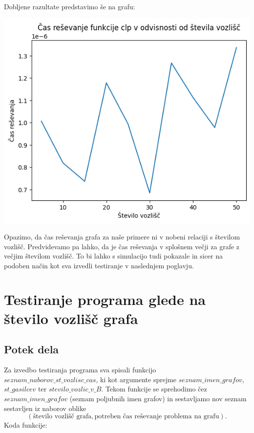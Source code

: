 \documentclass[a4paper, 12pt]{article}
\begin{document}
Dobljene razultate predstavimo še na grafu: \\
\begin{center}
    \includegraphics[scale=0.4]{cas}
\end{center}

\noindent Opazimo, da čas reševanja grafa za naše primere ni v nobeni relaciji s
številom vozlišč.
Predvidevamo pa lahko, da je čas reševanja v splošnem večji za grafe z večjim 
številom vozlišč. To bi lahko s simulacijo tudi pokazale in sicer na podoben način
kot sva izvedli testiranje v naslednjem poglavju. 

\pagebreak

\overfullrule=0pt
\section{Testiranje programa glede na število vozlišč grafa}

\subsection{Potek dela}

Za izvedbo testiranja programa sva spisali funkcijo $seznam\_naborov\_st\_vozlisc\_cas$, ki
kot argumente sprejme $seznam\_imen\_grafov$, $st\_gasilcev$ ter $stevilo\_vozlic\_v\_B$. Tekom
funkcije se sprehodimo čez $seznam\_imen\_grafov$ (seznam poljubnih imen grafov) in sestavljamo 
nov seznam sestavljen iz naborov oblike  
$$\left( \text{število vozlišč grafa}, \text{potreben čas reševanje problema na grafu} \right).$$
Koda funkcije:
\end{document}
